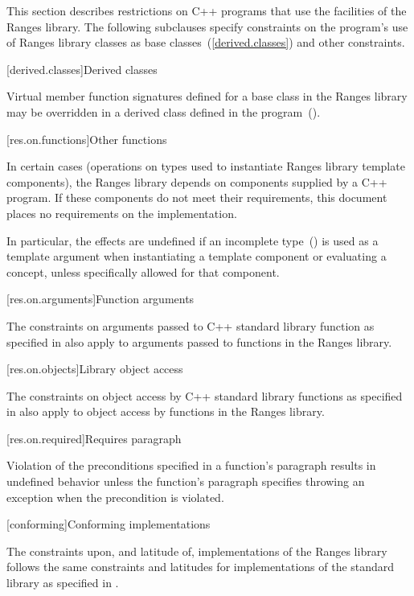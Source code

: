\pnum
This section describes restrictions on C++ programs that use the facilities of
the Ranges library. The following subclauses specify constraints on the
program's use of Ranges library classes as base classes~(\ref{derived.classes})
and other constraints.

[derived.classes]{Derived classes}

\pnum
Virtual member function signatures defined
%
for a base class in the Ranges
%
%
library may be overridden in a derived class defined in the
program~().

[res.on.functions]{Other functions}

\pnum
In certain cases (operations on types used to instantiate Ranges library
template components), the Ranges library depends on components supplied by a
C++ program. If these components do not meet their requirements, this document
places no requirements on the implementation.

\pnum
In particular, the effects are undefined if an incomplete
type~() is used as a template argument when instantiating a
template component or evaluating a concept, unless specifically allowed for that
component.

[res.on.arguments]{Function arguments}

\pnum
{}%
%
The constraints on arguments passed to C++ standard library function as
specified in  also apply to arguments passed to
functions in the Ranges library.

[res.on.objects]{Library object access}

\pnum
The constraints on object access by C++ standard library functions as specified
in  also apply to object access by functions in the
Ranges library.

[res.on.required]{Requires paragraph}

\pnum
{}%
Violation of the preconditions specified in a function's \requires paragraph
results in undefined behavior unless the function's \throws paragraph specifies
throwing an exception when the precondition is violated.

[conforming]{Conforming implementations}

\pnum
The constraints upon, and latitude of, implementations of the Ranges library
follows the same constraints and latitudes for implementations of the \Cpp
standard library as specified in .